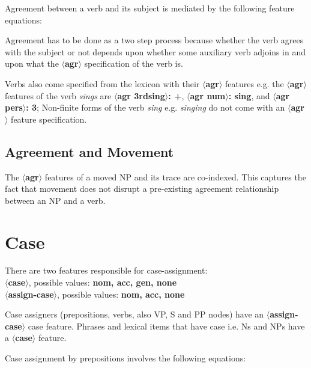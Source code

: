 Agreement between a verb and its subject is mediated by the following feature
equations:




Agreement has to be done as a two step process because whether the
verb agrees with the subject or not depends upon whether some auxiliary verb
adjoins in and upon what the {\bf $\langle$agr$\rangle$} specification of 
the verb is. 

Verbs also come specified from the lexicon with their {\bf $\langle$agr$\rangle$}
features e.g. the {\bf $\langle$agr$\rangle$} features of the
verb {\em sings} are {\bf $\langle$agr 3rdsing$\rangle$: +},
{\bf $\langle$agr num$\rangle$: sing}, 
and {\bf $\langle$agr pers$\rangle$: 3}; 
Non-finite forms of the verb {\em sing} e.g. {\em singing} do not come with
an {\bf $\langle$agr$\rangle$} feature specification. 

\subsection{Agreement and Movement}
The {\bf $\langle$agr$\rangle$} features of a moved NP and its trace 
are co-indexed. This captures the fact that movement does not disrupt 
a pre-existing agreement relationship between an NP and a verb.




\section{Case}
There are two features responsible for case-assignment:\\
{\bf $\langle$case$\rangle$}, possible values: {\bf nom, acc, gen, none}\\
{\bf $\langle$assign-case$\rangle$}, possible values: {\bf nom, acc, none}

Case assigners (prepositions, verbs, also
VP, S and PP nodes) have an {\bf $\langle$assign-case$\rangle$}
case feature. Phrases and lexical items
that have case i.e. Ns and NPs have a {\bf $\langle$case$\rangle$}
feature.

Case assignment by prepositions involves the following equations:



